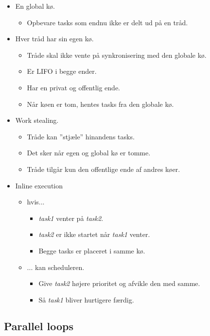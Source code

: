 \begin{itemize}
	\item En global kø.
	\begin{itemize}
		\item Opbevare tasks som endnu ikke er delt ud på en tråd.
	\end{itemize}
	\item Hver tråd har sin egen kø.
	\begin{itemize}
		\item Tråde skal ikke vente på synkronisering med den globale kø.
		\item Er LIFO i begge ender.
		\item Har en privat og offentlig ende.
		\item Når køen er tom, hentes tasks fra den globale kø.
	\end{itemize}
	\item Work stealing.
	\begin{itemize}
		\item Tråde kan ''stjæle'' hinandens tasks.
		\item Det sker når egen og global kø er tomme.
		\item Tråde tilgår kun den offentlige ende af andres køer.
	\end{itemize}
	\item Inline execution
	\begin{itemize}
		\item hvis...
		\begin{itemize}
			\item \textit{task1} venter på \textit{task2}.
			\item \textit{task2} er ikke startet når \textit{task1} venter.
			\item Begge tasks er placeret i samme kø.
		\end{itemize}
		\item ... kan scheduleren.
		\begin{itemize}
			\item Give \textit{task2} højere prioritet og afvikle den med samme.
			\item Så \textit{task1} bliver hurtigere færdig.
		\end{itemize}
	\end{itemize}
\end{itemize}

\subsection{Parallel loops}


